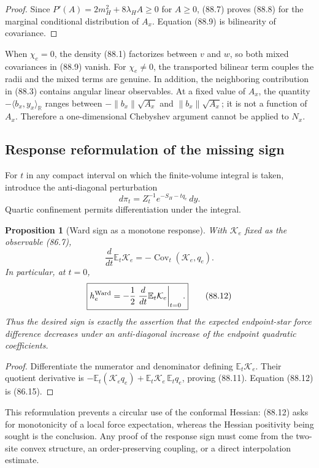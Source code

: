 \documentclass[11pt]{article}
\newtheorem{proposition}[theorem]{Proposition}
\theoremstyle{remark}
\begin{document}
\begin{proof}
Since \(P'(A)=2m_H^2+8\lambda_HA\geq0\) for \(A\geq0\), (88.7)
proves (88.8) for the marginal conditional distribution of \(A_x\).
Equation (88.9) is bilinearity of covariance.
\end{proof}

When \(\chi_e=0\), the density (88.1) factorizes between \(v\) and
\(w\), so both mixed covariances in (88.9) vanish.  For
\(\chi_e\ne0\), the transported bilinear term couples the radii and the
mixed terms are genuine.  In addition, the neighboring contribution
in (88.3) contains angular linear observables.  At a fixed value of
\(A_x\), the quantity
\(-\langle b_x,y_x\rangle_{\mathbb R}\) ranges between
\(-\|b_x\|\sqrt{A_x}\) and \(\|b_x\|\sqrt{A_x}\); it is not a function
of \(A_x\).  Therefore a one-dimensional Chebyshev argument cannot be
applied to \(N_x\).

\subsection{Response reformulation of the missing sign}

For \(t\) in any compact interval on which the finite-volume integral
is taken, introduce the anti-diagonal perturbation
\[
 d\pi_t=Z_t^{-1}e^{-S_H-tq_e}\,dy.                  \tag{88.10}
\]
Quartic confinement permits differentiation under the integral.

\begin{proposition}[Ward sign as a monotone response]
\label{prop:v17v88-response}
With \(\mathcal K_e\) fixed as the observable (86.7),
\[
 \frac{d}{dt}\mathbb E_t\mathcal K_e
 =-\operatorname{Cov}_t(\mathcal K_e,q_e).           \tag{88.11}
\]
In particular, at \(t=0\),
\[
\boxed{
 h_e^{\rm Ward}
 =-\frac12\left.\frac{d}{dt}
          \mathbb E_t\mathcal K_e\right|_{t=0}.}    \tag{88.12}
\]
Thus the desired sign is exactly the assertion that the expected
endpoint-star force difference decreases under an anti-diagonal
increase of the endpoint quadratic coefficients.
\end{proposition}

\begin{proof}
Differentiate the numerator and denominator defining
\(\mathbb E_t\mathcal K_e\).  Their quotient derivative is
\(-\mathbb E_t(\mathcal K_eq_e)+
\mathbb E_t\mathcal K_e\,\mathbb E_tq_e\), proving (88.11).
Equation (88.12) is (86.15).
\end{proof}

This reformulation prevents a circular use of the conformal Hessian:
(88.12) asks for monotonicity of a local force expectation, whereas the
Hessian positivity being sought is the conclusion.  Any proof of the
response sign must come from the two-site convex structure, an
order-preserving coupling, or a direct interpolation estimate.
\end{document}
